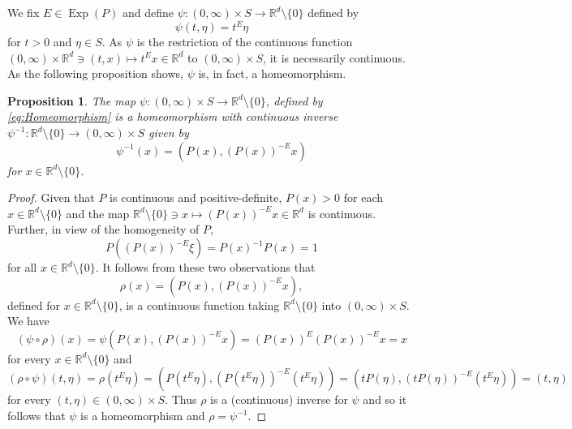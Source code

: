 \documentclass[11pt]{article}
\theoremstyle{theorem}
\newtheorem{proposition}[theorem]{Proposition}
\newcommand\Exp{\operatorname{Exp}}
\begin{document}
We fix $E\in\Exp(P)$ and define $\psi:(0,\infty)\times S\to\mathbb{R}^d\setminus\{0\}$ defined by
\begin{equation}\label{eq:Homeomorphism}
\psi(t,\eta)=t^E\eta
\end{equation}
for $t>0$ and $\eta\in S$. As $\psi$ is the restriction of the continuous function $(0,\infty)\times \mathbb{R}^d\ni (t,x)\mapsto t^E x\in\mathbb{R}^d$ to $(0,\infty)\times S$, it is necessarily continuous. As the following proposition shows, $\psi$ is, in fact, a homeomorphism.

\begin{proposition}\label{prop:PsiHomeomorphism}
The map $\psi:(0,\infty)\times S\to\mathbb{R}^d\setminus\{0\}$, defined by \eqref{eq:Homeomorphism} is a homeomorphism with continuous inverse $\psi^{-1}:\mathbb{R}^d\setminus\{0\}\to (0,\infty)\times S$ given by
\begin{equation*}
\psi^{-1}(x)=(P(x),(P(x))^{-E}x)
\end{equation*}
for $x\in\mathbb{R}^d\setminus\{0\}$.
\end{proposition}

\begin{proof}
Given that $P$ is continuous and positive-definite, $P(x)>0$ for each $x\in \mathbb{R}^d\setminus\{0\}$ and the map $\mathbb{R}^d\setminus\{0\}\ni x \mapsto (P(x))^{-E}x\in \mathbb{R}^d$ is continuous. Further, in view of the homogeneity of $P$,
\begin{equation*}
P\left((P(x))^{-E}\xi\right)=P(x)^{-1}P(x)=1
\end{equation*}
for all $x\in\mathbb{R}^d\setminus\{0\}$. It follows from these two observations that
\begin{equation*}
\rho(x)=(P(x),(P(x))^{-E}x),
\end{equation*}
defined for $x\in\mathbb{R}^d\setminus\{0\}$, is a continuous function taking $\mathbb{R}^d\setminus\{0\}$ into $(0,\infty)\times S$. We have
\begin{equation*}
(\psi\circ \rho)(x)=\psi(P(x),(P(x))^{-E}x)=(P(x))^{E}(P(x))^{-E}x=x
\end{equation*}
for every $x\in \mathbb{R}^d\setminus \{0\}$ and
\begin{equation*}
(\rho\circ\psi)(t,\eta)=\rho(t^E\eta)=(P(t^{E}\eta),(P(t^{E}\eta))^{-E}(t^E\eta))=(tP(\eta),(tP(\eta))^{-E}(t^{E}\eta))=(t,\eta)
\end{equation*}
for every $(t,\eta)\in (0,\infty)\times S$. Thus $\rho$ is a (continuous) inverse for $\psi$ and so it follows that $\psi$ is a homeomorphism and $\rho=\psi^{-1}$.
\end{proof}
\end{document}
